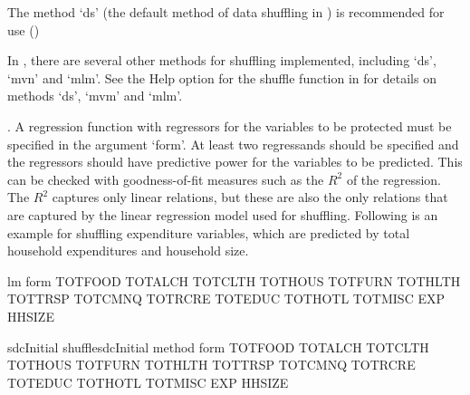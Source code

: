 \documentclass[letterpaper,10pt,english]{sphinxmanual}
\begin{document}
The method ‘ds’ (the default method of data shuffling in ) is
recommended for use ({\hyperref[\detokenize{anon_methods:temk14}]{}}) %
\begin{footnote}[21]\sphinxAtStartFootnote
In , there are several other methods for shuffling
implemented, including ‘ds’, ‘mvn’ and ‘mlm’. See the Help option for
the shuffle function in  for details on methods ‘ds’, ‘mvm’
and ‘mlm’.
%
\end{footnote}. A
regression function with regressors for the variables to be protected
must be specified in the argument ‘form’. At least two regressands
should be specified and the regressors should have predictive power for
the variables to be predicted. This can be checked with goodness-of-fit
measures such as the \(R^{2}\) of the regression. The \(R^{2}\)
captures only linear relations, but these are also the only relations
that are captured by the linear regression model used for shuffling.
Following is an example for shuffling expenditure variables, which are
predicted by total household expenditures and household size.

\def\sphinxLiteralBlockLabel{\label{\detokenize{anon_methods:code524}}}
%
\begin{sphinxVerbatim}[commandchars=\\\{\},numbers=left,firstnumber=1,stepnumber=1]
 lm form  TOTFOOD   TOTALCH  TOTCLTH  TOTHOUS 
                         TOTFURN  TOTHLTH   TOTTRSP  TOTCMNQ 
                         TOTRCRE  TOTEDUC  TOTHOTL  TOTMISC  EXP  HHSIZE

 sdcInitial  shufflesdcInitial method
                       form  TOTFOOD   TOTALCH  TOTCLTH  TOTHOUS 
                              TOTFURN  TOTHLTH   TOTTRSP  TOTCMNQ 
                              TOTRCRE  TOTEDUC  TOTHOTL  TOTMISC  EXP  HHSIZE
\end{sphinxVerbatim}
\end{document}
